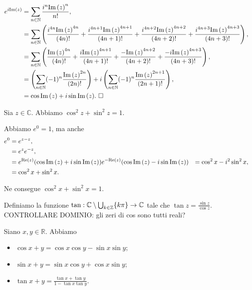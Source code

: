 \begin{align*}
	e^{i \text{Im} \left ( z \right )}
	&= \sum_{n \in \mathbb{N}} \frac{i^n \text{Im} \left ( z \right )^n}{n!},\\
	&= \sum_{n \in \mathbb{N}}
	\left ( \frac{i^{4n} \text{Im} \left ( z \right )^{4n}}{(4n)!}
	+ \frac{i^{4n + 1} \text{Im} \left ( z \right )^{4n + 1}}{(4n + 1)!}
	+ \frac{i^{4n + 2} \text{Im} \left ( z \right )^{4n + 2}}{(4n + 2)!}
	+ \frac{i^{4n + 3} \text{Im} \left ( z \right )^{4n + 3}}{(4n + 3)!} \right ),\\
	&= \sum_{n \in \mathbb{N}}
	\left ( \frac{\text{Im} \left ( z \right )^{4n}}{(4n)!}
	+ \frac{i \text{Im} \left ( z \right )^{4n + 1}}{(4n + 1)!}
	+ \frac{- \text{Im} \left ( z \right )^{4n + 2}}{(4n + 2)!}
	+ \frac{- i \text{Im} \left ( z \right )^{4n + 3}}{(4n + 3)!} \right ),\\
	&= \left (
      \sum_{n \in \mathbb{N}} (-1)^n \frac{\text{Im} \left ( z \right )^{2n}}{(2n)!}
      \right )
      + i
      \left (
      \sum_{n \in \mathbb{N}}
        (-1)^n \frac{\text{Im} \left ( z \right )^{2n + 1}}{(2n + 1)!}
      \right ),\\
	&= \cos{\text{Im} \left ( z \right )} + i \sin{\text{Im} \left ( z \right )}.
  \text{ $\square$}
\end{align*}
\begin{Corollary}
	Sia $z \in \mathbb{C}$. Abbiamo $\cos^2{z} + \sin^2{z} = 1$.
\end{Corollary}
\Proof Abbiamo $e^0 = 1$, ma anche
\begin{align*}
	e^0
	&= e^{z - z},\\
	&= e^z e^{-z},\\
	&= e^{\text{Re} \left ( z \right )}(\cos \text{Im} \left ( z \right ) + i \sin \text{Im} \left ( z \right ))
	  e^{- \text{Re} \left ( z \right )}(\cos \text{Im} \left ( z \right ) - i \sin \text{Im} \left ( z \right ))
	&= \cos^2{x} - i^2 \sin^2{x},\\
	&= \cos^2{x} + \sin^2{x}.
\end{align*}
\par Ne consegue $\cos^2{x} + \sin^2{x} = 1$. \EndProof
\begin{Definition}
  Definiamo  la funzione
  $\tan: \mathbb{C}
    \setminus \bigcup_{k \in \mathbb{Z}} \lbrace k\pi \rbrace
    \rightarrow \mathbb{C}$
  tale che $\tan{z} = \frac{\sin{z}}{\cos{z}}$.
CONTROLLARE DOMINIO: gli zeri di cos sono tutti reali?
\end{Definition}
\begin{Theorem}
  Siano $x, y \in \mathbb{R}$. Abbiamo
  \begin{itemize}
    \item $\cos{x + y} = \cos{x}\cos{y} - \sin{x}\sin{y}$;
    \item $\sin{x + y} = \sin{x}\cos{y} + \cos{x}\sin{y}$;
    \item $\tan{x + y} = \frac{\tan{x} + \tan{y}}{1 - \tan{x}\tan{y}}$.
  \end{itemize}
\end{Theorem}
